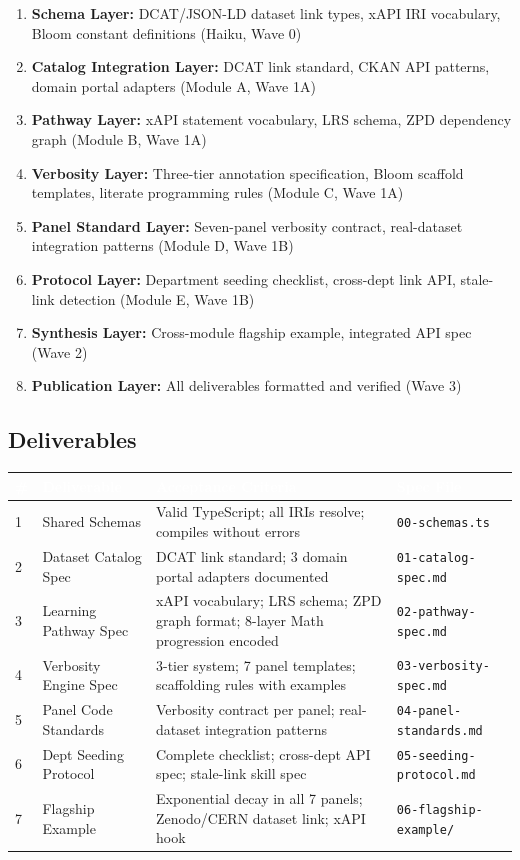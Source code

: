 \documentclass[11pt,letterpaper]{article}
\newcommand{\tableheader}[1]{\textbf{\sffamily\textcolor{white}{#1}}}
\begin{document}
\begin{enumerate}
  \item \textbf{Schema Layer:} DCAT/JSON-LD dataset link types, xAPI IRI vocabulary, Bloom constant definitions (Haiku, Wave 0)
  \item \textbf{Catalog Integration Layer:} DCAT link standard, CKAN API patterns, domain portal adapters (Module A, Wave 1A)
  \item \textbf{Pathway Layer:} xAPI statement vocabulary, LRS schema, ZPD dependency graph (Module B, Wave 1A)
  \item \textbf{Verbosity Layer:} Three-tier annotation specification, Bloom scaffold templates, literate programming rules (Module C, Wave 1A)
  \item \textbf{Panel Standard Layer:} Seven-panel verbosity contract, real-dataset integration patterns (Module D, Wave 1B)
  \item \textbf{Protocol Layer:} Department seeding checklist, cross-dept link API, stale-link detection (Module E, Wave 1B)
  \item \textbf{Synthesis Layer:} Cross-module flagship example, integrated API spec (Wave 2)
  \item \textbf{Publication Layer:} All deliverables formatted and verified (Wave 3)
\end{enumerate}

\subsection{Deliverables}

\begin{center}
\begin{tabularx}{\textwidth}{C{0.4cm}L{4cm}L{5cm}L{3cm}}
\toprule
{}
\tableheader{\#} & \tableheader{Deliverable} & \tableheader{Acceptance Criteria} & \tableheader{Spec File} \\
 & Shared Schemas & Valid TypeScript; all IRIs resolve; compiles without errors & \texttt{00-schemas.ts} \\
2 & Dataset Catalog Spec & DCAT link standard; 3 domain portal adapters documented & \texttt{01-catalog-spec.md} \\
3 & Learning Pathway Spec & xAPI vocabulary; LRS schema; ZPD graph format; 8-layer Math progression encoded & \texttt{02-pathway-spec.md} \\
4 & Verbosity Engine Spec & 3-tier system; 7 panel templates; scaffolding rules with examples & \texttt{03-verbosity-spec.md} \\
5 & Panel Code Standards & Verbosity contract per panel; real-dataset integration patterns & \texttt{04-panel-standards.md} \\
6 & Dept Seeding Protocol & Complete checklist; cross-dept API spec; stale-link skill spec & \texttt{05-seeding-protocol.md} \\
7 & Flagship Example & Exponential decay in all 7 panels; Zenodo/CERN dataset link; xAPI hook & \texttt{06-flagship-example/} \\
\bottomrule
\end{tabularx}
\end{center}
\end{document}
